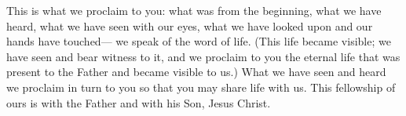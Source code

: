 \lettrine[lines=3]{T}{}his is what we proclaim to you:
what was from the beginning,
what we have heard,
what we have seen with our eyes,
what we have looked upon
and our hands have touched—
we speak of the word of life.
(This life became visible; we have seen and bear witness to it, and we proclaim to you the eternal life that was present to the Father and became visible to us.)
What we have seen and heard
we proclaim in turn to you
so that you may share life with us.
This fellowship of ours is with the Father
and with his Son, Jesus Christ.